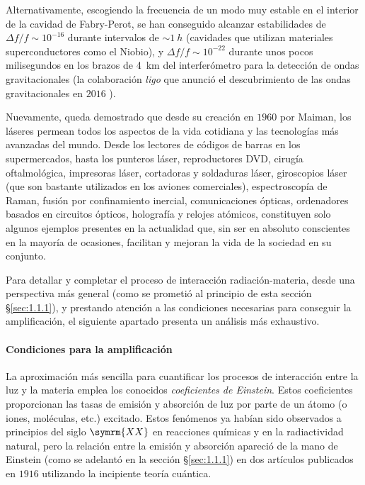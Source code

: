 Alternativamente, escogiendo la frecuencia de un modo muy estable en el interior de la cavidad de Fabry-Perot, se han conseguido alcanzar estabilidades de $\Delta f/f \sim 10^{-16}$ durante intervalos de $\sim \qty{1}{h}$ (cavidades que utilizan materiales superconductores como el Niobio), y $\Delta f/f \sim 10^{-22}$ durante unos pocos milisegundos \autocite{Mueller2016,Kwee2012} en los brazos de \qty{4}{km} del interferómetro para la detección de ondas gravitacionales (la colaboración \emph{\acrfull{ligo}} que anunció el descubrimiento de las ondas gravitacionales en $2016$ \autocite{Abbott2016}).

Nuevamente, queda demostrado que desde su creación en $1960$ por Maiman, los láseres permean todos los aspectos de la vida cotidiana y las tecnologías más avanzadas del mundo. Desde los lectores de códigos de barras en los supermercados, hasta los punteros láser, reproductores DVD, cirugía oftalmológica, impresoras láser, cortadoras y soldaduras láser, giroscopios láser (que son bastante utilizados en los aviones comerciales), espectroscopía de Raman, fusión por confinamiento inercial, comunicaciones ópticas, ordenadores basados en circuitos ópticos, holografía y relojes atómicos, constituyen solo algunos ejemplos presentes en la actualidad que, sin ser en absoluto conscientes en la mayoría de ocasiones, facilitan y mejoran la vida de la sociedad en su conjunto.

Para detallar y completar el proceso de interacción radiación-materia, desde una perspectiva más general (como se prometió al principio de esta sección \S\ref{sec:1.1.1}), y prestando atención a las condiciones necesarias para conseguir la amplificación, el siguiente apartado presenta un análisis más exhaustivo. 

\paragraph{Condiciones para la amplificación}
La aproximación más sencilla \autocite{Schwartz2013} para cuantificar los procesos de interacción entre la luz y la materia emplea los conocidos \emph{coeficientes de Einstein}. Estos coeficientes proporcionan las tasas de emisión y absorción de luz por parte de un átomo (o iones, moléculas, etc.) excitado. Estos fenómenos ya habían sido observados a principios del siglo $\symrm{XX}$ en reacciones químicas y en la radiactividad natural, pero la relación entre la emisión y absorción apareció de la mano de Einstein (como se adelantó en la sección \S\ref{sec:1.1.1}) en dos artículos \autocite{Einstein1916,Einstein1916a} publicados en $1916$ utilizando la incipiente teoría cuántica.

